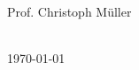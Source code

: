 \begin{titlepage}
\begin{minipage}{0.55\textwidth}
\begin{flushleft}
\end{flushleft}
\end{minipage}
~
\begin{minipage}{0.4\textwidth}
\begin{flushright} \large
Prof. Christoph Müller\\ %
\end{flushright}
\end{minipage}\\[2cm]




{\large \today}\\[3cm] %


 

\vfill %

\end{titlepage}
\cleardoublepage
%